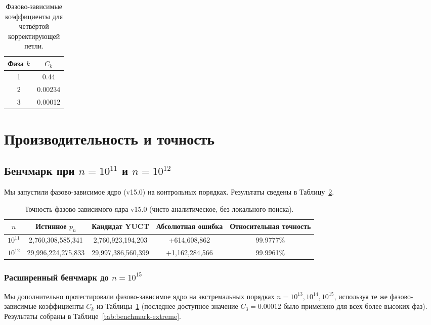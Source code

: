 \documentclass[12pt,a4paper]{article}
\begin{document}
	\begin{table}[htbp]
		\centering
		\caption{Фазово-зависимые коэффициенты для четвёртой корректирующей петли.}
		\label{tab:phase-coeffs}
		\begin{tabular}{c c}
			\toprule
			Фаза $k$ & $C_k$ \\
			\midrule
			1 & 0.44 \\
			2 & 0.00234 \\
			3 & 0.00012 \\
			\bottomrule
		\end{tabular}
	\end{table}
	
	\section{Производительность и точность}
	\label{sec:performance}
	\subsection{Бенчмарк при $n=10^{11}$ и $n=10^{12}$}
	Мы запустили фазово-зависимое ядро (v15.0) на контрольных порядках. Результаты сведены в Таблицу~\ref{tab:benchmark-v15}.
	
	\begin{table}[htbp]
		\centering
		\caption{Точность фазово-зависимого ядра v15.0 (чисто аналитическое, без локального поиска).}
		\label{tab:benchmark-v15}
		\begin{tabular}{c c c c c}
			\toprule
			$n$ & Истинное $p_n$ & Кандидат YUCT & Абсолютная ошибка & Относительная точность \\
			\midrule
			\(10^{11}\) & 2,760,308,585,341 & 2,760,923,194,203 & +614,608,862 & 99.9777\% \\
			\(10^{12}\) & 29,996,224,275,833 & 29,997,386,560,399 & +1,162,284,566 & 99.9961\% \\
			\bottomrule
		\end{tabular}
	\end{table}
	
	\subsubsection{Расширенный бенчмарк до \(n=10^{15}\)}
	
	Мы дополнительно протестировали фазово-зависимое ядро на экстремальных порядках
	\(n = 10^{13}, 10^{14}, 10^{15}\), используя те же фазово-зависимые коэффициенты
	\(C_k\) из Таблицы~\ref{tab:phase-coeffs} (последнее доступное значение
	\(C_3 = 0.00012\) было применено для всех более высоких фаз).
	Результаты собраны в Таблице~\ref{tab:benchmark-extreme}.
	
\end{document}
